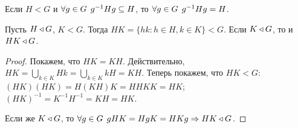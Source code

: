 \documentclass[main]{subfiles}
\begin{document}
\begin{remark}
  Если $H < G$ и $\forall {g \in G} \; \, g^{-1} H g \subseteq H$,
  то $\forall {g \in G} \; \, g^{-1}Hg = H$.
\end{remark}

\begin{proposition}
  Пусть $H \triangleleft G$, $K < G$.
  Тогда $HK = \{ hk : h \in H, k \in K \} < G$.
  Если $K \triangleleft G$, то и $HK \triangleleft G$.
\end{proposition}
\begin{proof}
  Покажем, что $HK = KH$.
  Действительно,
  $HK = \bigcup_{k \in K} Hk =
  \bigcup_{k \in K} kH = KH$.
  Теперь покажем, что $HK < G$:
  $(HK)(HK) = H(KH)K = HH KK = HK$;
  $(HK)^{-1} = K^{-1}H^{-1} = KH = HK$.

  Если же $K \triangleleft G$,
  то $\forall {g \in G} \; \,
  gHK = HgK = HKg \Rightarrow HK \triangleleft G$.
\end{proof}
\end{document}

